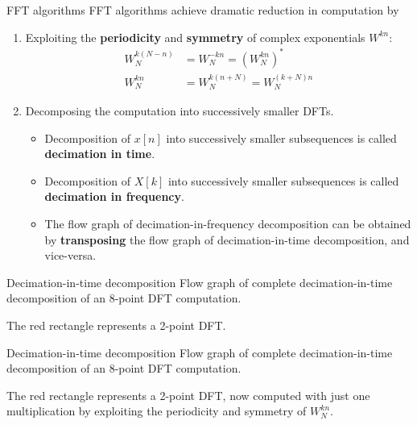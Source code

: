 \documentclass[10pt, aspectratio=169]{beamer}
\begin{document}
% 
\begin{frame}{FFT algorithms}
	FFT algorithms achieve dramatic reduction in computation by
	\begin{enumerate}
		\item Exploiting the \textbf{periodicity} and \textbf{symmetry} of complex exponentials $W^{kn}$:
		\begin{align*}
		W_N^{k(N-n)} &= W_N^{-kn} = (W_N^{kn})^* \tag{complex conjugate symmetry} \\
		W_N^{kn} &= W_N^{k(n+N)} = W_N^{(k+N)n}  \tag{periodicity in $n$ and $k$}
		\end{align*}
		\item Decomposing the computation into successively smaller DFTs. 
		\begin{itemize}
			\item Decomposition of $x[n]$ into successively smaller subsequences is called \textbf{decimation in time}.
			\item Decomposition of $X[k]$ into successively smaller subsequences is called \textbf{decimation in frequency}. 
			\item The flow graph of decimation-in-frequency decomposition can be obtained by \textbf{transposing} the flow graph of decimation-in-time decomposition, and vice-versa. 
		\end{itemize}
	\end{enumerate}
\end{frame}

% 
\begin{frame}{Decimation-in-time decomposition}
Flow graph of complete decimation-in-time decomposition of an 8-point DFT computation.

The red rectangle represents a 2-point DFT.
\begin{center}
\end{center}

\end{frame}

% 
\begin{frame}{Decimation-in-time decomposition}
Flow graph of complete decimation-in-time decomposition of an 8-point DFT computation.

The red rectangle represents a 2-point DFT, now computed with just one multiplication by exploiting the periodicity and symmetry of $W_N^{kn}$. 
\begin{center}
\end{center}
\end{frame}
\end{document}
